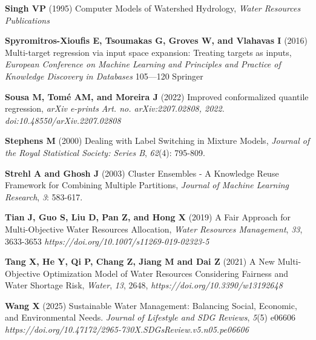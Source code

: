 \documentclass[ruler]{CUP-JNL-EDS}%
\begin{document}
\begin{Backmatter}
\begin{thebibliography}{}
\textbf{Singh VP} (1995) Computer Models of Watershed Hydrology, \textit{Water Resources Publications}

\textbf{Spyromitros-Xioufis E, Tsoumakas G, Groves W, and Vlahavas I} (2016) Multi-target regression via input space expansion: Treating targets as inputs, \textit{European Conference on Machine Learning and Principles and Practice of Knowledge Discovery in Databases} {105}--–{120} {Springer}

\textbf{Sousa M, Tomé AM, and Moreira J} (2022) Improved conformalized quantile regression, \textit{arXiv e-prints} \textit{Art. no. arXiv:2207.02808, 2022. doi:10.48550/arXiv.2207.02808}

\textbf{Stephens M} (2000) Dealing with Label Switching in Mixture Models, \textit{Journal of the Royal Statistical Society: Series B}, \textit{62}(4): 795-809.

\textbf{Strehl A and Ghosh J} (2003) Cluster Ensembles - A Knowledge Reuse Framework for Combining Multiple Partitions, \textit{Journal of Machine Learning Research}, \textit{3}: 583-617.

\bibitem[Tian et al., 2019][tian2019]
\textbf{Tian J, Guo S, Liu D, Pan Z, and Hong X} (2019) A Fair Approach for Multi-Objective Water Resources Allocation, \textit{Water Resources Management}, \textit{33}, 3633-3653 \textit{https://doi.org/10.1007/s11269-019-02323-5}

\textbf{Tang X, He Y, Qi P, Chang Z, Jiang M and Dai Z} (2021) A New Multi-Objective Optimization Model of Water Resources Considering Fairness and Water Shortage Risk, \textit{Water}, \textit{13}, 2648, \textit{https://doi.org/10.3390/w13192648}

\textbf{Wang X} (2025) Sustainable Water Management: Balancing Social, Economic, and Environmental Needs. \textit{Journal of Lifestyle and SDG Reviews}, \textit{5}(5) e06606 \textit{https://doi.org/10.47172/2965-730X.SDGsReview.v5.n05.pe06606}

\end{thebibliography}
\end{Backmatter}
\end{document}
